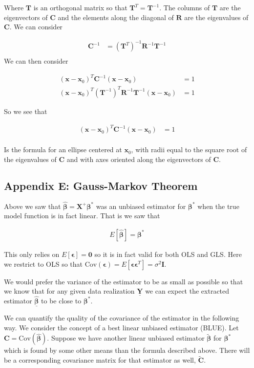 \documentclass[12pt]{article}
\newcommand{\ep}{\epsilon}
\newcommand{\bv}[1]{\boldsymbol{#1}}
\newcommand{\ul}[1]{\underline{#1}}
\begin{document}
Where $\bv{T}$ is an orthogonal matrix so that $\bv{T}^T = \bv{T}^{-1}$. The columns of $\bv{T}$ are the eigenvectors of $\bv{C}$ and the elements along the diagonal of $\bv{R}$ are the eigenvalues of $\bv{C}$.
We can consider

\begin{align}
\bv{C}^{-1} &= (\bv{T}^T)^{-1} \bv{R}^{-1} \bv{T}^{-1}\\
\end{align}
 We can then consider

\begin{align}
(\bv{x}-\bv{x}_0)^T \bv{C}^{-1}(\bv{x}-\bv{x}_0) &= 1\\
(\bv{x}-\bv{x}_0)^T (\bv{T}^{-1})^T \bv{R}^{-1} \bv{T}^{-1}(\bv{x}-\bv{x}_0) &= 1
\end{align}

So we see that

\begin{align}
(\bv{x}-\bv{x}_0)^T \bv{C}^{-1}(\bv{x}-\bv{x}_0) &= 1\\
\end{align}

Is the formula for an ellipse centered at $\bv{x}_0$, with radii equal to the square root of the eigenvalues of $\bv{C}$ and with axes oriented along the eigenvectors of $\bv{C}$.

\subsection{Appendix E: Gauss-Markov Theorem}

Above we saw that $\bv{\hat{\beta}} = \bv{X}^+\bv{\beta^*}$ was an unbiased estimator for $\bv{\beta^*}$ when the true model function is in fact linear.
That is we saw that

\begin{align}
E\left[\bv{\hat{\beta}}\right] = \bv{\beta^*}
\end{align}

This only relies on $E[\bv{\ep}] = \bv{0}$ so it is in fact valid for both OLS and GLS. 
Here we restrict to OLS so that $\text{Cov}(\bv{\ep}) = E[\bv{\ep}\bv{\ep}^T] = \sigma^2\bv{I}$.

We would prefer the variance of the estimator to be as small as possible so that we know that for any given data realization $\ul{\bv{Y}}$ we can expect the extracted estimator $\ul{\bv{\hat{\beta}}}$ to be close to $\bv{\beta^*}$.

We can quantify the quality of the covariance of the estimator in the following way. We consider the concept of a best linear unbiased estimator (BLUE). 
Let $\bv{C} = \text{Cov}(\bv{\hat{\beta}})$. 
Suppose we have another linear unbiased estimator $\bv{\tilde{\beta}}$ for $\bv{\beta^*}$ which is found by some other means than the formula described above. 
There will be a corresponding covariance matrix for that estimator as well, $\bv{\tilde{C}}$.
\end{document}
